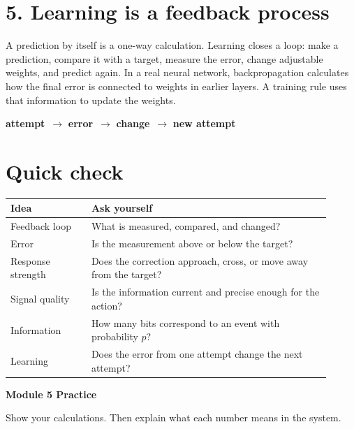 \documentclass[12pt]{article}
\begin{document}
\section*{5. Learning is a feedback process}
A prediction by itself is a one-way calculation. Learning closes a loop: make a prediction, compare it with a target, measure the error, change adjustable weights, and predict again. In a real neural network, backpropagation calculates how the final error is connected to weights in earlier layers. A training rule uses that information to update the weights.

\begin{mdframed}[backgroundcolor=pale,linecolor=gold]
\centering\textbf{attempt}\ $\longrightarrow$ \textbf{error}\ $\longrightarrow$ \textbf{change}\ $\longrightarrow$ \textbf{new attempt}
\end{mdframed}

\section*{Quick check}
\begin{tabular}{>{\raggedright\arraybackslash}p{0.23\linewidth}p{0.68\linewidth}}
\toprule
\textbf{Idea} & \textbf{Ask yourself}\\
\midrule
Feedback loop & What is measured, compared, and changed?\\
Error & Is the measurement above or below the target?\\
Response strength & Does the correction approach, cross, or move away from the target?\\
Signal quality & Is the information current and precise enough for the action?\\
Information & How many bits correspond to an event with probability $p$?\\
Learning & Does the error from one attempt change the next attempt?\\
\bottomrule
\end{tabular}

\newpage
\begin{center}
{\Large\bfseries\color{navy}Module 5 Practice}
\end{center}
\noindent Show your calculations. Then explain what each number means in the system.
\end{document}
